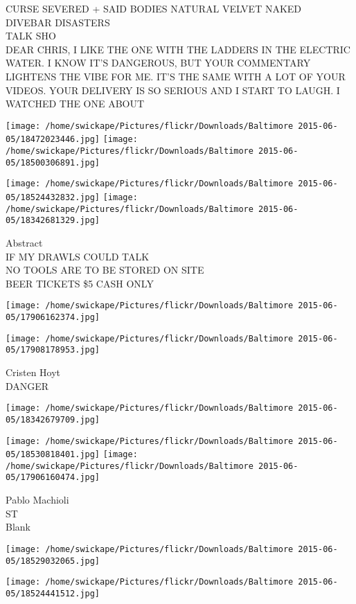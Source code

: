 \documentclass[10pt,letterpaper]{article}
\begin{document}
CURSE SEVERED  + SAID BODIES NATURAL VELVET NAKED\\
DIVEBAR DISASTERS\\
TALK SHO\\
DEAR CHRIS, I LIKE THE ONE WITH THE LADDERS IN THE ELECTRIC WATER.  I KNOW IT'S DANGEROUS, BUT YOUR COMMENTARY LIGHTENS THE VIBE FOR ME.  IT'S THE SAME WITH A LOT OF YOUR VIDEOS.  YOUR DELIVERY IS SO SERIOUS AND I START TO LAUGH.  I WATCHED THE ONE ABOUT
\pagebreak

\texttt{[image: /home/swickape/Pictures/flickr/Downloads/Baltimore 2015-06-05/18472023446.jpg]}
\texttt{[image: /home/swickape/Pictures/flickr/Downloads/Baltimore 2015-06-05/18500306891.jpg]}

\texttt{[image: /home/swickape/Pictures/flickr/Downloads/Baltimore 2015-06-05/18524432832.jpg]}
\texttt{[image: /home/swickape/Pictures/flickr/Downloads/Baltimore 2015-06-05/18342681329.jpg]}

Abstract\\
IF MY DRAWLS COULD TALK\\
NO TOOLS ARE TO BE STORED ON SITE\\
BEER TICKETS \$5 CASH ONLY
\pagebreak

\texttt{[image: /home/swickape/Pictures/flickr/Downloads/Baltimore 2015-06-05/17906162374.jpg]}

\vspace{0.25in}
\texttt{[image: /home/swickape/Pictures/flickr/Downloads/Baltimore 2015-06-05/17908178953.jpg]}

Cristen Hoyt\\
DANGER
\pagebreak

\texttt{[image: /home/swickape/Pictures/flickr/Downloads/Baltimore 2015-06-05/18342679709.jpg]}

\vspace{0.25in}
\texttt{[image: /home/swickape/Pictures/flickr/Downloads/Baltimore 2015-06-05/18530818401.jpg]}
\texttt{[image: /home/swickape/Pictures/flickr/Downloads/Baltimore 2015-06-05/17906160474.jpg]}

Pablo Machioli\\
ST\\
Blank
\pagebreak

\texttt{[image: /home/swickape/Pictures/flickr/Downloads/Baltimore 2015-06-05/18529032065.jpg]}

\vspace{0.25in}
\texttt{[image: /home/swickape/Pictures/flickr/Downloads/Baltimore 2015-06-05/18524441512.jpg]}
\end{document}

